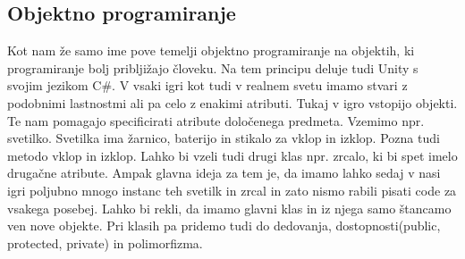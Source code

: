 {\color{indiagreen}\subsection{Objektno programiranje}}
Kot nam že samo ime pove temelji objektno programiranje na objektih, ki programiranje bolj pribljižajo človeku. Na tem principu deluje tudi Unity s svojim jezikom C\#. V vsaki igri kot tudi v realnem svetu imamo stvari z podobnimi lastnostmi ali pa celo z enakimi atributi. Tukaj v igro vstopijo objekti. Te nam pomagajo specificirati atribute določenega predmeta. Vzemimo npr. svetilko. Svetilka ima žarnico, baterijo in stikalo za vklop in izklop. Pozna tudi metodo vklop in izklop. Lahko bi vzeli tudi drugi klas npr. zrcalo, ki bi spet imelo drugačne atribute. Ampak glavna ideja za tem je, da imamo lahko sedaj v nasi igri poljubno mnogo instanc teh svetilk in zrcal in zato nismo rabili pisati code za vsakega posebej. Lahko bi rekli, da imamo glavni klas in iz njega samo štancamo ven nove objekte. Pri klasih pa pridemo tudi do dedovanja, dostopnosti(public, protected, private) in polimorfizma.
